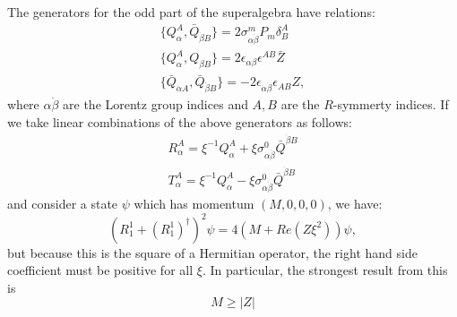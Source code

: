 \begin{example}
\begin{example}[$d=4$,$\sn=2$]
The generators for the odd part of the superalgebra have relations:
\begin{gather}
  \{Q_\alpha^A,\bar{Q}_{\dot{\beta}B}\} = 2\sigma^m_{\alpha\dot{\beta}}P_m\delta^A_B \\
  \{Q_\alpha^A,Q_{\beta B}\} = 2\epsilon_{\alpha\beta}\epsilon^{AB}\bar{Z}\\
  \{\bar{Q}_{\dot{\alpha}A},\bar{Q}_{\dot{\beta}B}\}
  = -2\epsilon_{\dot{\alpha}\dot{\beta}}\epsilon_{AB}Z,
\end{gather}
where $\alpha\dot{\beta}$ are the Lorentz group indices and $A,B$ are the
$R$-symmerty indices.
If we take linear combinations of the above generators as follows:
\begin{gather}
  R_\alpha^A = \xi^{-1}Q_\alpha^A
  + \xi\sigma^0_{\alpha\dot{\beta}}\bar{Q}^{\dot{\beta}B}\\
  T_\alpha^A = \xi^{-1}Q_\alpha^A - \xi\sigma^0_{\alpha\dot{\beta}}\bar{Q}^{\dot{\beta}B}
\end{gather}
and consider a state $\psi$ which has momentum $(M,0,0,0)$, we have:
\begin{equation}
  \left(R_1^1+(R_1^1)^\dagger\right)^2\psi = 4(M+Re(Z\xi^2))\psi,
\end{equation}
but because this is the square of a Hermitian operator, the right hand side
coefficient must be positive for all $\xi$. In particular, the strongest result from this is
\begin{equation}
  M\geq|Z|
\end{equation}
\end{example}

\end{example}
